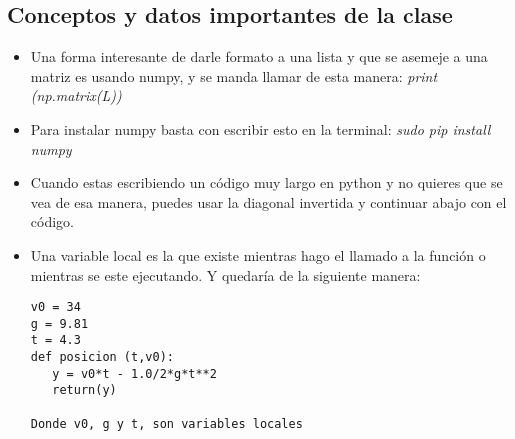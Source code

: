 \documentclass{book}
\begin{document}
	\subsection {Conceptos y datos importantes de la clase}
	\begin{itemize}
		\item Una forma interesante de darle formato a una lista y que se asemeje a una matriz es usando numpy, y se manda llamar de esta manera: \textit{print (np.matrix(L))}\\
		
		
		\item Para instalar numpy basta con escribir esto en la terminal: \textit{sudo pip install numpy}\\
		
		\item Cuando estas escribiendo un código muy largo en python y no quieres que se vea de esa manera, puedes usar la diagonal invertida y continuar abajo con el código.\\
		
		\item Una variable local es la que existe mientras hago el llamado a la función o mientras se este ejecutando. Y quedaría de la siguiente manera:  \begin{lstlisting}
v0 = 34
g = 9.81
t = 4.3
def posicion (t,v0):
   y = v0*t - 1.0/2*g*t**2
   return(y)
		
Donde v0, g y t, son variables locales			
		\end{lstlisting}
		
		
		
	\end{itemize}
	
	
	
\end{document}
